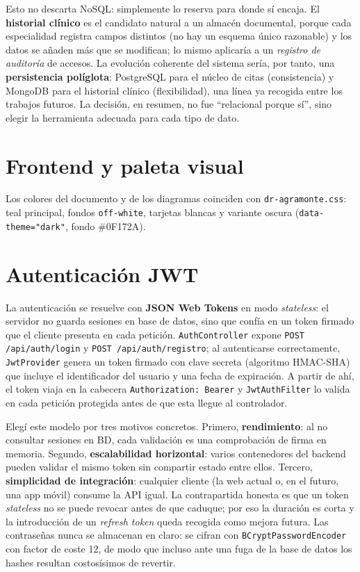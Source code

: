 \documentclass[12pt,a4paper]{report}
\begin{document}
Esto no descarta NoSQL: simplemente lo reserva para donde sí encaja. El \textbf{historial clínico} es el candidato natural a un almacén documental, porque cada especialidad registra campos distintos (no hay un esquema único razonable) y los datos se añaden más que se modifican; lo mismo aplicaría a un \emph{registro de auditoría} de accesos. La evolución coherente del sistema sería, por tanto, una \textbf{persistencia políglota}: PostgreSQL para el núcleo de citas (consistencia) y MongoDB para el historial clínico (flexibilidad), una línea ya recogida entre los trabajos futuros. La decisión, en resumen, no fue ``relacional porque sí'', sino elegir la herramienta adecuada para cada tipo de dato.

\section{Frontend y paleta visual}

Los colores del documento y de los diagramas coinciden con \texttt{dr-agramonte.css}: teal principal, fondos \texttt{off-white}, tarjetas blancas y variante oscura (\texttt{data-theme="dark"}, fondo \#0F172A).



\section{Autenticación JWT}

La autenticación se resuelve con \textbf{JSON Web Tokens} en modo \emph{stateless}: el servidor no guarda sesiones en base de datos, sino que confía en un token firmado que el cliente presenta en cada petición. \texttt{AuthController} expone \texttt{POST /api/auth/login} y \texttt{POST /api/auth/registro}; al autenticarse correctamente, \texttt{JwtProvider} genera un token firmado con clave secreta (algoritmo HMAC-SHA) que incluye el identificador del usuario y una fecha de expiración. A partir de ahí, el token viaja en la cabecera \texttt{Authorization: Bearer} y \texttt{JwtAuthFilter} lo valida en cada petición protegida antes de que esta llegue al controlador.

Elegí este modelo por tres motivos concretos. Primero, \textbf{rendimiento}: al no consultar sesiones en BD, cada validación es una comprobación de firma en memoria. Segundo, \textbf{escalabilidad horizontal}: varios contenedores del backend pueden validar el mismo token sin compartir estado entre ellos. Tercero, \textbf{simplicidad de integración}: cualquier cliente (la web actual o, en el futuro, una app móvil) consume la API igual. La contrapartida honesta es que un token \emph{stateless} no se puede revocar antes de que caduque; por eso la duración es corta y la introducción de un \emph{refresh token} queda recogida como mejora futura. Las contraseñas nunca se almacenan en claro: se cifran con \texttt{BCryptPasswordEncoder} con factor de coste 12, de modo que incluso ante una fuga de la base de datos los hashes resultan costosísimos de revertir.
\end{document}

